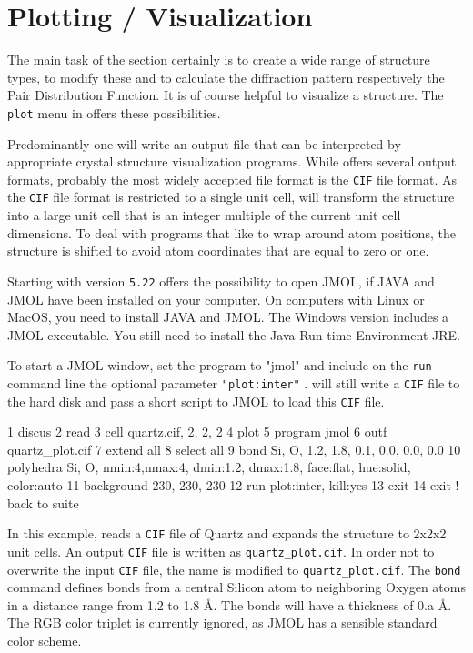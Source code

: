 
\section{Plotting / Visualization \label{struc-plot}}

The main task of the \Discus section certainly is to create a wide 
range of structure types, to modify these and to calculate the diffraction
pattern respectively the Pair Distribution Function. It is of course 
helpful to visualize a structure. The {\tt plot} menu in \Discus offers
these possibilities. 

Predominantly one will write an output file that can be interpreted 
by appropriate crystal structure visualization programs. While 
\Discus offers several output formats, probably the most widely accepted
file format is the {\tt CIF} file format. As the {\tt CIF} file 
format is restricted to a single unit cell, \Discus will transform the
structure into a large unit cell that is an integer multiple of the current  
unit cell dimensions. To deal with programs that like to wrap around
atom positions, the structure is shifted to avoid atom coordinates that
are equal to zero or one.

Starting with version {\tt 5.22} \Discus offers the possibility to
open JMOL, if JAVA and JMOL have been installed on your computer. 
On computers with Linux or MacOS, you need to install JAVA and JMOL. 
The Windows version includes a JMOL executable. You still need to 
install the Java Run time Environment JRE. 

To start a JMOL window, set the program to "jmol" and include 
on the {\tt run} command line
the optional parameter {\tt "plot:inter"} 
. \Discus will still write a {\tt CIF} file to 
the hard disk and pass a short script to JMOL to load this {\tt CIF} file.

\begin{MacVerbatim}
 1  discus
 2  read
 3    cell quartz.cif, 2, 2, 2
 4  plot
 5    program   jmol
 6    outf      quartz_plot.cif
 7    extend    all
 8    select    all
 9    bond      Si, O, 1.2, 1.8, 0.1, 0.0, 0.0, 0.0
10    polyhedra Si, O, nmin:4,nmax:4, dmin:1.2, dmax:1.8, face:flat, hue:solid, color:auto
11    background 230, 230, 230
12    run plot:inter, kill:yes
13  exit
14  exit  ! back to suite
\end{MacVerbatim}

In this example, \Discus reads a {\tt CIF} file of Quartz and expands the 
structure to 2x2x2 unit cells. An output {\tt CIF} file is written as
{\tt quartz\_plot.cif}. In order not to overwrite the input {\tt CIF} file,
the name is modified to {\tt quartz\_plot.cif}. The {\tt bond} command
defines bonds from a central Silicon atom to neighboring Oxygen atoms
in a distance range from 1.2 to 1.8 \AA{}. The bonds will have a thickness
of 0.a \AA. The RGB color triplet is currently ignored, as JMOL has a
sensible standard color scheme. 

